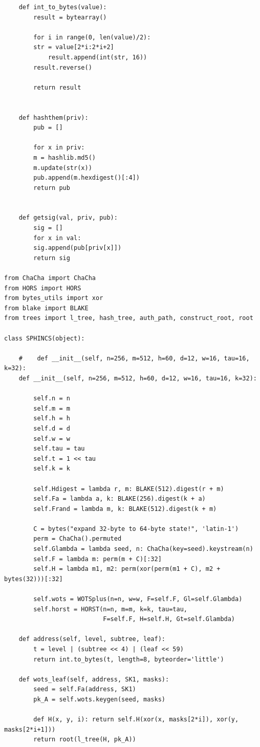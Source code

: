 \documentclass[a4paper, 14pt]{extarticle}
\begin{document}
\begin{verbatim}
    def int_to_bytes(value):
        result = bytearray()

        for i in range(0, len(value)/2):
        str = value[2*i:2*i+2]
            result.append(int(str, 16))
        result.reverse()

        return result


    def hashthem(priv):
        pub = []

        for x in priv:
        m = hashlib.md5()
        m.update(str(x))
        pub.append(m.hexdigest()[:4])
        return pub


    def getsig(val, priv, pub):
        sig = []
        for x in val:
        sig.append(pub[priv[x]])
        return sig

from ChaCha import ChaCha
from HORS import HORS
from bytes_utils import xor
from blake import BLAKE
from trees import l_tree, hash_tree, auth_path, construct_root, root

class SPHINCS(object):

    #    def __init__(self, n=256, m=512, h=60, d=12, w=16, tau=16, k=32):
    def __init__(self, n=256, m=512, h=60, d=12, w=16, tau=16, k=32):

        self.n = n
        self.m = m
        self.h = h
        self.d = d
        self.w = w
        self.tau = tau
        self.t = 1 << tau
        self.k = k

        self.Hdigest = lambda r, m: BLAKE(512).digest(r + m)
        self.Fa = lambda a, k: BLAKE(256).digest(k + a)
        self.Frand = lambda m, k: BLAKE(512).digest(k + m)

        C = bytes("expand 32-byte to 64-byte state!", 'latin-1')
        perm = ChaCha().permuted
        self.Glambda = lambda seed, n: ChaCha(key=seed).keystream(n)
        self.F = lambda m: perm(m + C)[:32]
        self.H = lambda m1, m2: perm(xor(perm(m1 + C), m2 + bytes(32)))[:32]

        self.wots = WOTSplus(n=n, w=w, F=self.F, Gl=self.Glambda)
        self.horst = HORST(n=n, m=m, k=k, tau=tau,
                           F=self.F, H=self.H, Gt=self.Glambda)

    def address(self, level, subtree, leaf):
        t = level | (subtree << 4) | (leaf << 59)
        return int.to_bytes(t, length=8, byteorder='little')

    def wots_leaf(self, address, SK1, masks):
        seed = self.Fa(address, SK1)
        pk_A = self.wots.keygen(seed, masks)

        def H(x, y, i): return self.H(xor(x, masks[2*i]), xor(y, masks[2*i+1]))
        return root(l_tree(H, pk_A))


\end{verbatim}
\end{document}
